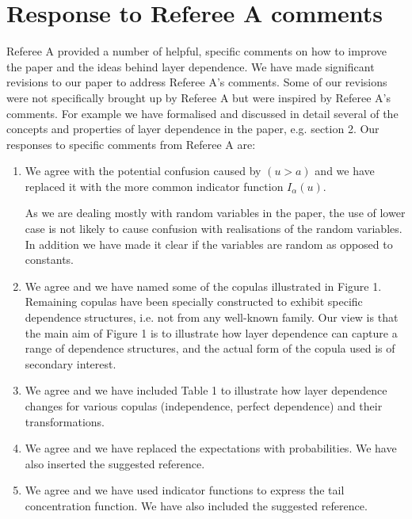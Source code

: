 \documentclass[a4paper, 12pt]{report}
\begin{document}
\section*{Response to Referee A comments}




Referee A provided a number of helpful, specific comments on how to improve the paper and the ideas behind layer dependence. We have made significant revisions to our paper to address Referee A's comments. Some of our revisions were not specifically brought up by Referee A but were inspired by Referee A's comments. For example we have formalised and discussed in detail several of the concepts and properties of layer dependence in the paper, e.g. section 2.
Our responses to specific comments from Referee A are:


\begin{enumerate}

\item We agree with the potential confusion caused by $(u>a)$ and we have replaced it with the more common indicator function $I_\alpha(u)$.

As we are dealing mostly with random variables in the paper, the use of lower case is not likely to cause confusion with realisations of the random variables. In addition we have made it clear if the variables are random as opposed to constants.

\item	We agree and we have named some of the copulas illustrated in Figure 1. Remaining copulas have been specially constructed to exhibit specific dependence structures, i.e. not from any well-known family. Our view is that the main aim of Figure 1 is to illustrate how layer dependence can capture a range of dependence structures, and the actual form of the copula used is of secondary interest.

\item	We agree and we have included Table 1 to illustrate how layer dependence changes for various copulas (independence, perfect dependence) and their transformations.

\item	We agree and we have replaced the expectations with probabilities. We have also inserted the suggested reference.

\item	We agree and we have used indicator functions to express the tail concentration function. We have also included the suggested reference.


\end{enumerate}
\end{document}
